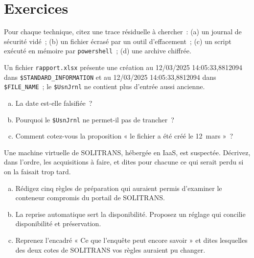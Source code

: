 \section*{Exercices}

\begin{boxexo}[title={\ding{45}\quad Exercice~13.1. Trace résiduelle \niveaubase}]
Pour chaque technique, citez une trace résiduelle à chercher~: (a) un
journal de sécurité vidé~; (b) un fichier écrasé par un outil d'effacement~;
(c) un script exécuté en mémoire par \texttt{powershell}~; (d) une archive
chiffrée.
\end{boxexo}

\begin{boxexo}[title={\ding{45}\quad Exercice~13.2. Vraie ou fausse date \niveaumoyen}]
Un fichier \texttt{rapport.xlsx} présente une création au 12/03/2025
14:05:33,8812094 dans \texttt{\$STANDARD\_INFORMATION} et au 12/03/2025
14:05:33,8812094 dans \texttt{\$FILE\_NAME}~; le \texttt{\$UsnJrnl} ne
contient plus d'entrée aussi ancienne.
\begin{enumerate}[(a)]
    \item La date est-elle falsifiée~?
    \item Pourquoi le \texttt{\$UsnJrnl} ne permet-il pas de trancher~?
    \item Comment cotez-vous la proposition « le fichier a été créé le
          12~mars »~?
\end{enumerate}
\end{boxexo}

\begin{boxexo}[title={\ding{45}\quad Exercice~13.3. Acquérir dans le nuage \niveaumoyen}]
Une machine virtuelle de SOLITRANS, hébergée en IaaS, est suspectée.
Décrivez, dans l'ordre, les acquisitions à faire, et dites pour chacune ce
qui serait perdu si on la faisait trop tard.
\end{boxexo}

\begin{boxexo}[title={\ding{45}\quad Exercice~13.4. Préparer les conteneurs \niveauexpert}]
\begin{enumerate}[(a)]
    \item Rédigez cinq règles de préparation qui auraient permis d'examiner
          le conteneur compromis du portail de SOLITRANS.
    \item La reprise automatique sert la disponibilité. Proposez un réglage
          qui concilie disponibilité et préservation.
    \item Reprenez l'encadré « Ce que l'enquête peut encore savoir » et dites
          lesquelles des deux cotes \NEK{} de SOLITRANS vos règles auraient
          pu changer.
\end{enumerate}
\end{boxexo}

